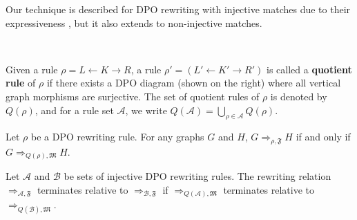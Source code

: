 \noindent Our technique is described for DPO rewriting with injective matches due to their expressiveness \cite{habel2001double}, but it also extends to non-injective matches.

\begin{definition} 
    \ \newline 
    \noindent
    \begin{minipage}{0.7\textwidth}
        Given a rule $\rho = L \leftarrow K \rightarrow R$, a rule $\rho' = (L' \leftarrow K' \rightarrow R')$ is called a \textbf{quotient rule} of $\rho$ if there exists a DPO diagram (shown on the right)
    where all vertical graph morphisms are surjective. The set of quotient rules of $\rho$ is denoted by $Q(\rho)$, and 
    for a rule set $\mathcal{A}$, we write $Q(\mathcal{A}) = \bigcup_{\rho\in\mathcal{A}} Q(\rho)$.
    \end{minipage}
    \hfill
    \begin{minipage}{0.29\textwidth}
        \hfill
    \end{minipage}
\end{definition}

\begin{lemma}
    Let $\rho$ be a DPO rewriting rule. For any graphs $G$ and $H$,
    $G \Rightarrow_{\rho,\mathfrak{F}} H$ if and only if $G \Rightarrow_{Q(\rho),\mathfrak{M}} H$.
\end{lemma}
\begin{corollary}
    \label{cor:termination}
    Let \(\mathcal{A}\) and \(\mathcal{B}\) be sets of injective DPO rewriting rules. 
    The rewriting relation $\Rightarrow_{\mathcal{A},\mathfrak{F}}$ terminates relative to $\Rightarrow_{\mathcal{B},\mathfrak{F}}$ 
    if 
    $\Rightarrow_{Q(\mathcal{A}),\mathfrak{M}}$ terminates relative to $\Rightarrow_{Q(\mathcal{B}),\mathfrak{M}}$.
\end{corollary}